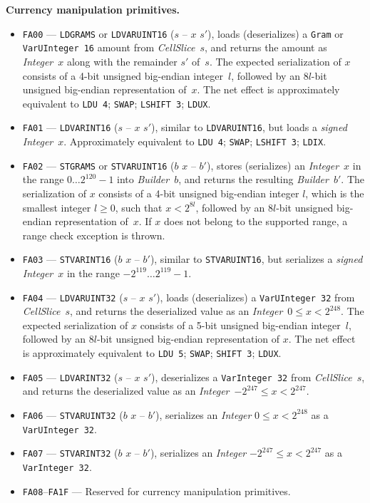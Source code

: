\documentclass[12pt,oneside]{article}
\def\makepoint#1{\medbreak\noindent{\bf #1.\ }}
\def\nxsubpoint{\refstepcounter{subsubsection}%
    \smallbreak\makepoint{\thesubsubsection}}
\def\emb#1{\textbf{#1.}}
\begin{document}
\nxsubpoint\emb{Currency manipulation primitives}
\begin{itemize}
\item {\tt FA00} --- {\tt LDGRAMS} or {\tt LDVARUINT16} ($s$ -- $x$ $s'$), loads (deserializes) a {\tt Gram\/} or {\tt VarUInteger 16} amount from {\em CellSlice\/}~$s$, and returns the amount as {\em Integer\/}~$x$ along with the remainder $s'$ of~$s$. The expected serialization of $x$ consists of a 4-bit unsigned big-endian integer~$l$, followed by an $8l$-bit unsigned big-endian representation of~$x$. The net effect is approximately equivalent to {\tt LDU 4}; {\tt SWAP}; {\tt LSHIFT 3}; {\tt LDUX}.
\item {\tt FA01} --- {\tt LDVARINT16} ($s$ -- $x$ $s'$), similar to {\tt LDVARUINT16}, but loads a {\em signed\/} {\em Integer\/}~$x$. Approximately equivalent to {\tt LDU 4}; {\tt SWAP}; {\tt LSHIFT 3}; {\tt LDIX}.
\item {\tt FA02} --- {\tt STGRAMS} or {\tt STVARUINT16} ($b$ $x$ -- $b'$), stores (serializes) an {\em Integer\/}~$x$ in the range $0\ldots2^{120}-1$ into {\em Builder\/}~$b$, and returns the resulting {\em Builder\/}~$b'$. The serialization of $x$ consists of a 4-bit unsigned big-endian integer $l$, which is the smallest integer $l\geq0$, such that $x<2^{8l}$, followed by an $8l$-bit unsigned big-endian representation of~$x$. If $x$ does not belong to the supported range, a range check exception is thrown.
\item {\tt FA03} --- {\tt STVARINT16} ($b$ $x$ -- $b'$), similar to {\tt STVARUINT16}, but serializes a {\em signed\/} {\em Integer\/}~$x$ in the range $-2^{119}\ldots2^{119}-1$.
\item {\tt FA04} --- {\tt LDVARUINT32} ($s$ -- $x$ $s'$), loads (deserializes) a {\tt VarUInteger 32} from {\em CellSlice\/}~$s$, and returns the deserialized value as an {\em Integer\/}~$0\leq x<2^{248}$. The expected serialization of $x$ consists of a 5-bit unsigned big-endian integer~$l$, followed by an $8l$-bit unsigned big-endian representation of $x$. The net effect is approximately equivalent to {\tt LDU 5}; {\tt SWAP}; {\tt SHIFT 3}; {\tt LDUX}.
\item {\tt FA05} --- {\tt LDVARINT32} ($s$ -- $x$ $s'$), deserializes a {\tt VarInteger 32} from {\em CellSlice\/}~$s$, and returns the deserialized value as an {\em Integer\/}~$-2^{247}\leq x<2^{247}$.
\item {\tt FA06} --- {\tt STVARUINT32} ($b$ $x$ -- $b'$), serializes an {\em Integer\/} $0\leq x<2^{248}$ as a {\tt VarUInteger 32}.
\item {\tt FA07} --- {\tt STVARINT32} ($b$ $x$ -- $b'$), serializes an {\em Integer\/} $-2^{247}\leq x<2^{247}$ as a {\tt VarInteger 32}.
\item {\tt FA08}--{\tt FA1F} --- Reserved for currency manipulation primitives.
\end{itemize}
\end{document}
